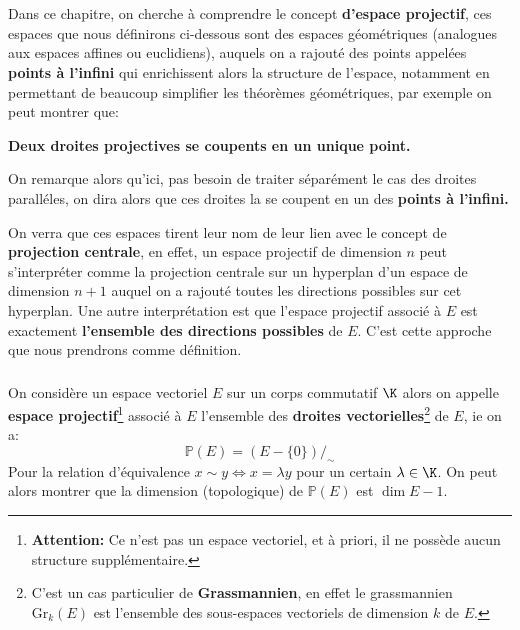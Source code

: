 \documentclass{report}
\begin{document}
   \chapter*{}
   Dans ce chapitre, on cherche à comprendre le concept \textbf{d'espace projectif}, ces espaces que nous définirons ci-dessous sont des espaces géométriques (analogues aux espaces affines ou euclidiens), auquels on a rajouté des points appelées \textbf{points à l'infini} qui enrichissent alors la structure de l'espace, notamment en permettant de beaucoup simplifier les théorèmes géométriques, par exemple on peut montrer que:
   \begin{center}
      \textbf{Deux droites projectives se coupents en un unique point.}
   \end{center}
   On remarque alors qu'ici, pas besoin de traiter séparément le cas des droites paralléles, on dira alors que ces droites la se coupent en un des \textbf{points à l'infini.}\<

   On verra que ces espaces tirent leur nom de leur lien avec le concept de \textbf{projection centrale}, en effet, un espace projectif de dimension \(n\) peut s'interpréter comme la projection centrale sur un hyperplan d'un espace de dimension \(n+1\) auquel on a rajouté toutes les directions possibles sur cet hyperplan. Une autre interprétation est que l'espace projectif associé à \(E\) est exactement \textbf{l'ensemble des directions possibles} de \(E\). C'est cette approche que nous prendrons comme définition.

   \subsection*{}
   On considère un espace vectoriel \(E\) sur un corps commutatif \(\K\) alors on appelle \textbf{espace projectif}\footnote[1]{\textbf{Attention:} Ce n'est pas un espace vectoriel, et à priori, il ne possède aucun structure supplémentaire.} associé à \(E\) l'ensemble des \textbf{droites vectorielles}\footnote[2]{C'est un cas particulier de \textbf{Grassmannien}, en effet le grassmannien \(\text{Gr}_k(E)\) est l'ensemble des sous-espaces vectoriels de dimension \(k\) de \(E\).} de \(E\), ie on a:
   \[
      \mathbb{P}(E) = (E - \{0\})/_\sim
   \]
   Pour la relation d'équivalence \(x \sim y \Longleftrightarrow x = \lambda y\) pour un certain \(\lambda \in \K\). On peut alors montrer que la dimension (topologique) de \(\mathbb{P}(E)\) est \(\dim{E} - 1\).\<
   
\end{document}
